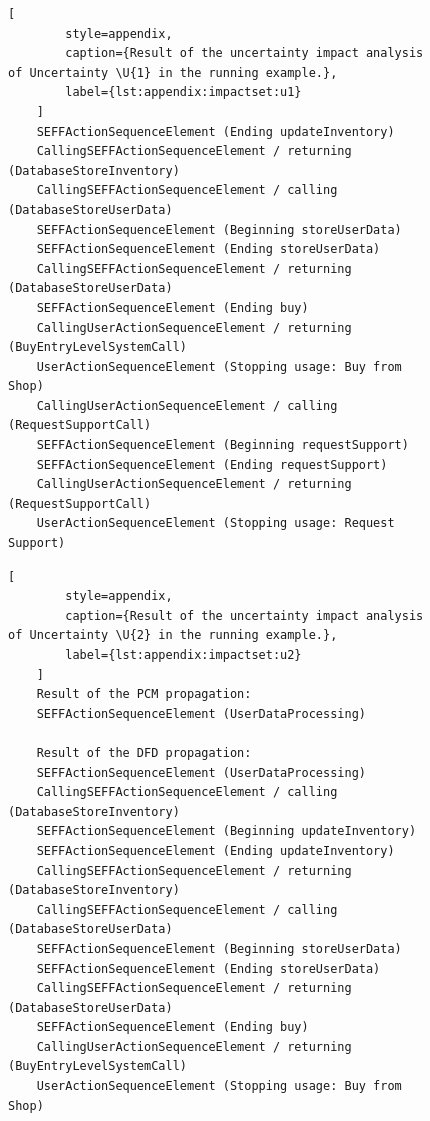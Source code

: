 \begin{figure}
\begin{lstlisting}[
        style=appendix,
        caption={Result of the uncertainty impact analysis of Uncertainty \U{1} in the running example.},
        label={lst:appendix:impactset:u1}
    ]
    SEFFActionSequenceElement (Ending updateInventory)
    CallingSEFFActionSequenceElement / returning (DatabaseStoreInventory)
    CallingSEFFActionSequenceElement / calling (DatabaseStoreUserData)
    SEFFActionSequenceElement (Beginning storeUserData)
    SEFFActionSequenceElement (Ending storeUserData)
    CallingSEFFActionSequenceElement / returning (DatabaseStoreUserData)
    SEFFActionSequenceElement (Ending buy)
    CallingUserActionSequenceElement / returning (BuyEntryLevelSystemCall)
    UserActionSequenceElement (Stopping usage: Buy from Shop)
    CallingUserActionSequenceElement / calling (RequestSupportCall)
    SEFFActionSequenceElement (Beginning requestSupport)
    SEFFActionSequenceElement (Ending requestSupport)
    CallingUserActionSequenceElement / returning (RequestSupportCall)
    UserActionSequenceElement (Stopping usage: Request Support)
    \end{lstlisting}
\end{figure}

\begin{figure}
    \begin{lstlisting}[
        style=appendix,
        caption={Result of the uncertainty impact analysis of Uncertainty \U{2} in the running example.},
        label={lst:appendix:impactset:u2}
    ]
    Result of the PCM propagation:
    SEFFActionSequenceElement (UserDataProcessing)

    Result of the DFD propagation:
    SEFFActionSequenceElement (UserDataProcessing)
    CallingSEFFActionSequenceElement / calling (DatabaseStoreInventory)
    SEFFActionSequenceElement (Beginning updateInventory)
    SEFFActionSequenceElement (Ending updateInventory)
    CallingSEFFActionSequenceElement / returning (DatabaseStoreInventory)
    CallingSEFFActionSequenceElement / calling (DatabaseStoreUserData)
    SEFFActionSequenceElement (Beginning storeUserData)
    SEFFActionSequenceElement (Ending storeUserData)
    CallingSEFFActionSequenceElement / returning (DatabaseStoreUserData)
    SEFFActionSequenceElement (Ending buy)
    CallingUserActionSequenceElement / returning (BuyEntryLevelSystemCall)
    UserActionSequenceElement (Stopping usage: Buy from Shop)
    \end{lstlisting}
\end{figure}

